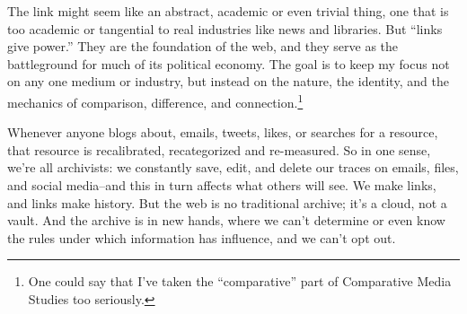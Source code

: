 The link might seem like an abstract, academic or even trivial thing, one that is too academic or tangential to real industries like news and libraries. But ``links give power.'' They are the foundation of the web, and they serve as the battleground for much of its political economy. %
The goal is to keep my focus not on any one medium or industry, but instead on the nature, the identity, and the mechanics of comparison, difference, and connection.\footnote{One could say that I've taken the ``comparative'' part of Comparative Media Studies too seriously.}

Whenever anyone blogs about, emails, tweets, likes, or searches for a resource, that resource is recalibrated, recategorized and re-measured. So in one sense, we're all archivists: we constantly save, edit, and delete our traces on emails, files, and social media--and this in turn affects what others will see. We make links, and links make history. But the web is no traditional archive; it's a cloud, not a vault. And the archive is in new hands, where we can't determine or even know the rules under which information has influence, and we can't opt out.
